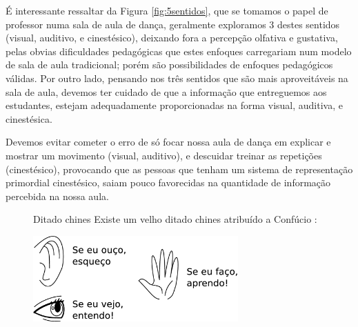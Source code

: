 É interessante ressaltar da Figura \ref{fig:5sentidos}, 
que se tomamos o papel de professor  numa sala de aula de dança, 
geralmente exploramos 3 destes sentidos
(visual, auditivo, e cinestésico), 
deixando fora a percepção olfativa e gustativa, 
pelas obvias dificuldades pedagógicas que estes enfoques carregariam num modelo de sala de aula tradicional;
porém são possibilidades de enfoques pedagógicos válidas.
Por outro lado, pensando nos três sentidos que são mais aproveitáveis na sala de aula,
devemos ter cuidado de que a informação que entreguemos aos estudantes, 
estejam adequadamente proporcionadas na forma visual, auditiva, e cinestésica.
\begin{tcbattention}
Devemos evitar cometer o erro de só focar nossa aula de dança em explicar e mostrar um movimento (visual, auditivo),
e descuidar treinar as repetições (cinestésico), 
provocando que as pessoas que tenham um sistema de representação primordial cinestésico, 
saiam pouco favorecidas na quantidade de informação percebida na nossa aula.
\end{tcbattention}


\begin{figure}[!ht]
\begin{elaboracion}{Ditado chines}
Existe um velho ditado chines atribuído a Confúcio \cite[pp. 60, 63]{AprendendoInteligencia2008} \cite[pp. 9]{abe2002introducao}:

\begin{center}
    \includegraphics[width=0.7\textwidth]{chapters/cap-learning/ditadochines.eps}
\end{center}
\end{elaboracion}
\end{figure}

